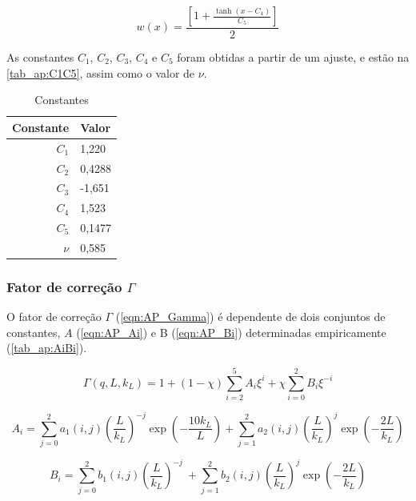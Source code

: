 \begin{apendicesenv}
\begin{equation}
w(x) = \frac{\left[1 + \frac{\tanh(x-C_4)}{C_5}\right]}{2}
\label{eqn:AP_w}
\end{equation}

As constantes \(C_1\), \(C_2\), \(C_3\), \(C_4\) e \(C_5\) foram obtidas a partir de um ajuste, e estão na \autoref{tab_ap:C1C5}, assim como o valor de \(\nu\).
\begin{table}
    \IBGEtab%
    {\caption{Constantes}
    \label{tab_ap:C1C5} }%
    {\begin{tabular}{r p{2cm}}
      \toprule
      Constante 	& Valor \\
      \midrule
      \(C_1\)			&  1,220	\\
      \(C_2\)			&  0,4288	\\
      \(C_3\)			&  -1,651	\\
      \(C_4\)			&  1,523	\\
      \(C_5\)			&  0,1477 	\\	
      \(\nu\)			&  0,585	\\					
      \bottomrule
    \end{tabular}}%
    {}%
\end{table}


\subsubsection{Fator de correção \(\Gamma\)}

O fator de correção \(\Gamma\) (\autoref{eqn:AP_Gamma}) é dependente de dois conjuntos de constantes, \(A\) (\autoref{eqn:AP_Ai}) e B (\autoref{eqn:AP_Bi}) determinadas empiricamente (\autoref{tab_ap:AiBi}).

\begin{equation}
\Gamma\left( q,L,k_{L} \right) = 1 + \left( 1 - \chi \right)\sum_{i = 2}^{5}{A_{i}\xi^{i}} + \chi\sum_{i = 0}^{2}{B_{i}\xi^{- i}}
\label{eqn:AP_Gamma}
\end{equation}

\begin{equation}
A_{i} = \sum_{j = 0}^{2}{a_{1}\left( i,j \right)\left( \frac{L}{k_{L}} \right)^{- j}\exp\left( - \frac{10k_{L}}{L} \right)} + \sum_{j = 1}^{2}{a_{2}\left( i,j \right)\left( \frac{L}{k_{L}} \right)^{j}\exp\left( - \frac{2L}{k_{L}} \right)}
\label{eqn:AP_Ai}
\end{equation}

\begin{equation}
B_{i} = \sum_{j = 0}^{2}{b_{1}\left( i,j \right)\left( \frac{L}{k_{L}} \right)^{- j}\ } + \sum_{j = 1}^{2}{b_{2}\left( i,j \right)\left( \frac{L}{k_{L}} \right)^{j}\exp\left( - \frac{2L}{k_{L}} \right)}
\label{eqn:AP_Bi}
\end{equation}


\end{apendicesenv}
